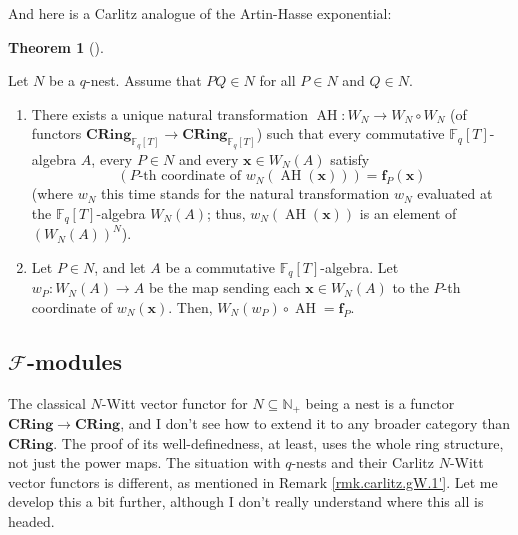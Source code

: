 \documentclass[numbers=enddot,12pt,final,onecolumn,notitlepage]{scrartcl}%
\theoremstyle{definition}
\newtheorem{theo}{Theorem}[section]
\newenvironment{theorem}[1][]
{\begin{theo}[#1]\begin{leftbar}}
{\end{leftbar}\end{theo}}
\begin{document}
And here is a Carlitz analogue of the Artin-Hasse exponential:

\begin{theorem}
\label{thm.carlitz.Witt.AH}Let $N$ be a $q$-nest. Assume that $PQ\in N$ for
all $P\in N$ and $Q\in N$.

\begin{enumerate}
\item[\textbf{(a)}] There exists a unique natural transformation
$\operatorname*{AH}:W_{N}\rightarrow W_{N}\circ W_{N}$ (of functors
$\mathbf{CRing}_{\mathbb{F}_{q}\left[  T\right]  }\rightarrow\mathbf{CRing}%
_{\mathbb{F}_{q}\left[  T\right]  }$) such that every commutative
$\mathbb{F}_{q}\left[  T\right]  $-algebra $A$, every $P\in N$ and every
$\mathbf{x}\in W_{N}\left(  A\right)  $ satisfy%
\[
\left(  P\text{-th coordinate of }w_{N}\left(  \operatorname*{AH}\left(
\mathbf{x}\right)  \right)  \right)  =\mathbf{f}_{P}\left(  \mathbf{x}\right)
\]
(where $w_{N}$ this time stands for the natural transformation $w_{N}$
evaluated at the $\mathbb{F}_{q}\left[  T\right]  $-algebra $W_{N}\left(
A\right)  $; thus, $w_{N}\left(  \operatorname*{AH}\left(  \mathbf{x}\right)
\right)  $ is an element of $\left(  W_{N}\left(  A\right)  \right)  ^{N}$).

\item[\textbf{(b)}] Let $P\in N$, and let $A$ be a commutative $\mathbb{F}%
_{q}\left[  T\right]  $-algebra. Let $w_{P}:W_{N}\left(  A\right)  \rightarrow
A$ be the map sending each $\mathbf{x}\in W_{N}\left(  A\right)  $ to the
$P$-th coordinate of $w_{N}\left(  \mathbf{x}\right)  $. Then, $W_{N}\left(
w_{P}\right)  \circ\operatorname*{AH}=\mathbf{f}_{P}$.
\end{enumerate}
\end{theorem}

\subsection{\label{subsect.F}$\mathcal{F}$-modules}

The classical $N$-Witt vector functor for $N\subseteq\mathbb{N}_{+}$ being a
nest is a functor $\mathbf{CRing}\rightarrow\mathbf{CRing}$, and I don't see
how to extend it to any broader category than $\mathbf{CRing}$. The proof of
its well-definedness, at least, uses the whole ring structure, not just the
power maps. The situation with $q$-nests and their Carlitz $N$-Witt vector
functors is different, as mentioned in Remark \ref{rmk.carlitz.gW.1'}. Let me
develop this a bit further, although I don't really understand where this all
is headed.
\end{document}
